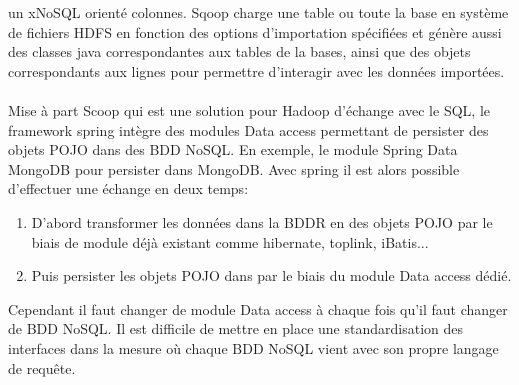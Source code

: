 un x\textsf{NoSQL} orienté colonnes. \textsf{Sqoop} charge
une table ou toute la base en système de fichiers \textsf{HDFS} en
fonction des options d'importation spécifiées et génère aussi des
classes \textsf{java} correspondantes aux tables de la bases, ainsi
que des objets correspondants aux lignes pour permettre d'interagir
avec les données importées.
\\
\\
Mise à part \textsf{Scoop} qui est une solution pour \textsf{Hadoop}
d'échange avec le \textsf{SQL}, le framework
\textsf{spring} intègre des modules \textsf{Data access}\cite{springsource} permettant 
de persister des objets \textsf{POJO} dans des \textsf{BDD NoSQL}. En
exemple, le module \textsf{Spring Data MongoDB} pour persister
dans \textsf{MongoDB}. Avec \textsf{spring} il est alors possible
d'effectuer une échange en deux temps:
\begin{enumerate}
\item D'abord transformer les données dans la \textsf{BDDR} en des objets 
      \textsf{POJO} par le biais de module déjà existant
      comme \textsf{hibernate, toplink, iBatis}...
\item Puis persister les objets \textsf{POJO} dans par le biais du module 
      \textsf{Data access} dédié.    
\end{enumerate} 
Cependant il faut changer de module \textsf{Data access} à chaque fois
qu'il faut changer de \textsf{BDD NoSQL}. Il est difficile de mettre
en place une standardisation des interfaces dans la mesure où
chaque \textsf{BDD NoSQL} vient avec son propre langage de requête.
